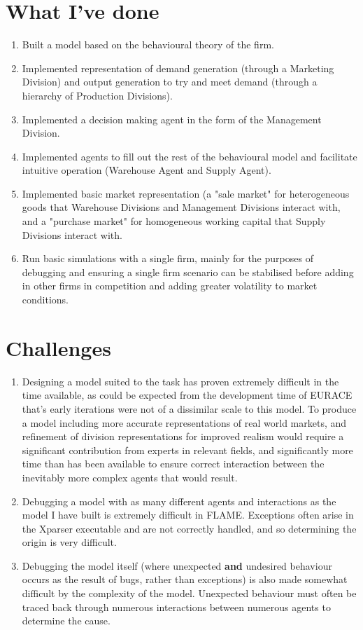 \documentclass[11pt]{article}
\begin{document}
\section{What I've done}
\begin{enumerate}
	\item Built a model based on the behavioural theory of the firm.
	\item Implemented representation of demand generation (through a Marketing Division) and output generation to try and meet demand (through a hierarchy of Production Divisions).
	\item Implemented a decision making agent in the form of the Management Division.
	\item Implemented agents to fill out the rest of the behavioural model and facilitate intuitive operation (Warehouse Agent and Supply Agent).
	\item Implemented basic market representation (a "sale market" for heterogeneous goods that Warehouse Divisions and Management Divisions interact with, and a "purchase market" for homogeneous working capital that Supply Divisions interact with.
	\item Run basic simulations with a single firm, mainly for the purposes of debugging and ensuring a single firm scenario can be stabilised before adding in other firms in competition and adding greater volatility to market conditions.
\end{enumerate}
\section{Challenges}
\begin{enumerate}
	\item Designing a model suited to the task has proven extremely difficult in the time available, as could be expected from the development time of EURACE that's early iterations were not of a dissimilar scale to this model. To produce a model including more accurate representations of real world markets, and refinement of division representations for improved realism would require a significant contribution from experts in relevant fields, and significantly more time than has been available to ensure correct interaction between the inevitably more complex agents that would result.
	\item Debugging a model with as many different agents and interactions as the model I have built is extremely difficult in FLAME. Exceptions often arise in the Xparser executable and are not correctly handled, and so determining the origin is very difficult.
	\item Debugging the model itself (where unexpected \textbf{and} undesired behaviour occurs as the result of bugs, rather than exceptions) is also made somewhat difficult by the complexity of the model. Unexpected behaviour must often be traced back through numerous interactions between numerous agents to determine the cause.
\end{enumerate}	
\end{document}
